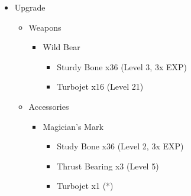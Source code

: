 \documentclass{report}
\begin{document}
\begin{upgrade}
\begin{itemize}
    \item Upgrade
    \begin{itemize}
        \item Weapons
        \begin{itemize}
            \item Wild Bear
            \begin{itemize}
                \item Sturdy Bone x36 (Level 3, 3x EXP)
                \item Turbojet x16 (Level 21)
            \end{itemize}
        \end{itemize}
        \item Accessories
        \begin{itemize}
            \item Magician's Mark
            \begin{itemize}
                \item Study Bone x36 (Level 2, 3x EXP)
                \item Thrust Bearing x3 (Level 5)
                \item Turbojet x1 (*)
            \end{itemize}
        \end{itemize}
    \end{itemize}
\end{itemize}
\end{upgrade}
\end{document}

